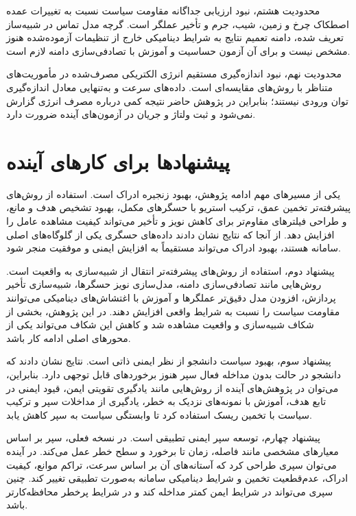 محدودیت هشتم، نبود ارزیابی جداگانه مقاومت سیاست نسبت به تغییرات عمده اصطکاک چرخ و زمین، شیب، جرم و تأخیر عملگر است. گرچه مدل تماس در شبیه‌ساز تعریف شده، دامنه تعمیم نتایج به شرایط دینامیکی خارج از تنظیمات آزموده‌شده هنوز مشخص نیست و برای آن آزمون حساسیت و آموزش با تصادفی‌سازی دامنه لازم است.

محدودیت نهم، نبود اندازه‌گیری مستقیم انرژی الکتریکی مصرف‌شده در مأموریت‌های متناظر با روش‌های مقایسه‌ای است. داده‌های سرعت و  به‌تنهایی معادل اندازه‌گیری توان ورودی نیستند؛ بنابراین در پژوهش حاضر نتیجه کمی درباره مصرف انرژی گزارش نمی‌شود و ثبت ولتاژ و جریان در آزمون‌های آینده ضرورت دارد.

\section{پیشنهادها برای کارهای آینده}
\label{sec:future_work}

یکی از مسیرهای مهم ادامه پژوهش، بهبود زنجیره ادراک است. استفاده از روش‌های پیشرفته‌تر تخمین عمق، ترکیب استریو با حسگرهای مکمل، بهبود تشخیص هدف و مانع، و طراحی فیلترهای مقاوم‌تر برای کاهش نویز و تأخیر می‌تواند کیفیت مشاهده عامل را افزایش دهد. از آنجا که نتایج نشان دادند داده‌های حسگری یکی از گلوگاه‌های اصلی سامانه هستند، بهبود ادراک می‌تواند مستقیماً به افزایش ایمنی و موفقیت منجر شود.

پیشنهاد دوم، استفاده از روش‌های پیشرفته‌تر انتقال از شبیه‌سازی به واقعیت است. روش‌هایی مانند تصادفی‌سازی دامنه، مدل‌سازی نویز حسگرها، شبیه‌سازی تأخیر پردازش، افزودن مدل دقیق‌تر عملگرها و آموزش با اغتشاش‌های دینامیکی می‌توانند مقاومت سیاست را نسبت به شرایط واقعی افزایش دهند. در این پژوهش، بخشی از شکاف شبیه‌سازی و واقعیت مشاهده شد و کاهش این شکاف می‌تواند یکی از محورهای اصلی ادامه کار باشد.

پیشنهاد سوم، بهبود سیاست دانشجو از نظر ایمنی ذاتی است. نتایج نشان دادند که دانشجو در حالت بدون مداخله فعال سپر هنوز برخوردهای قابل توجهی دارد. بنابراین، می‌توان در پژوهش‌های آینده از روش‌هایی مانند یادگیری تقویتی ایمن، قیود ایمنی در تابع هدف، آموزش با نمونه‌های نزدیک به خطر، یادگیری از مداخلات سپر و ترکیب سیاست با تخمین ریسک استفاده کرد تا وابستگی سیاست به سپر کاهش یابد.

پیشنهاد چهارم، توسعه سپر ایمنی تطبیقی است. در نسخه فعلی، سپر بر اساس معیارهای مشخصی مانند فاصله، زمان تا برخورد و سطح خطر عمل می‌کند. در آینده می‌توان سپری طراحی کرد که آستانه‌های آن بر اساس سرعت، تراکم موانع، کیفیت ادراک، عدم‌قطعیت تخمین و شرایط دینامیکی سامانه به‌صورت تطبیقی تغییر کند. چنین سپری می‌تواند در شرایط ایمن کمتر مداخله کند و در شرایط پرخطر محافظه‌کارتر باشد.

